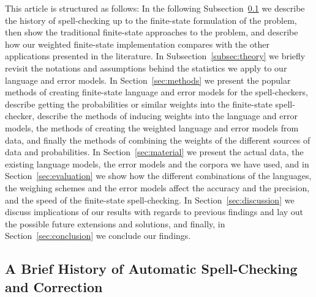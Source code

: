 \documentclass[a4paper,12pt]{article}
\begin{document}
This article is structured as follows: In the following
Subsection~\ref{subsec:background} we describe the history of spell-checking up
to the finite-state formulation of the problem, then show the traditional
finite-state approaches to the problem, and describe how our weighted
finite-state implementation compares with the other applications presented in
the literature.  In Subsection~\ref{subsec:theory} we briefly revisit the
notations and assumptions behind the statistics we apply to our language and
error models.  In Section~\ref{sec:methods} we present the popular methods of
creating finite-state language and error models for the spell-checkers,
describe getting the probabilities or similar weights into the finite-state
spell-checker, describe the methods of inducing weights into the language and
error models, the methods of creating the weighted language and error models
from data, and finally the methods of combining the weights of the different
sources of data and probabilities. In Section~\ref{sec:material} we present the
actual data, the existing language models, the error models and the corpora we
have used, and in Section~\ref{sec:evaluation} we show how the different
combinations of the languages, the weighing schemes and the error models affect
the accuracy and the precision, and the speed of the finite-state
spell-checking. In Section~\ref{sec:discussion} we discuss implications of
our results with regards to previous findings and lay out the possible future
extensions and solutions, and finally, in Section~\ref{sec:conclusion} we
conclude our findings.

\subsection{A Brief History of Automatic Spell-Checking and Correction}
\label{subsec:background}
\end{document}
